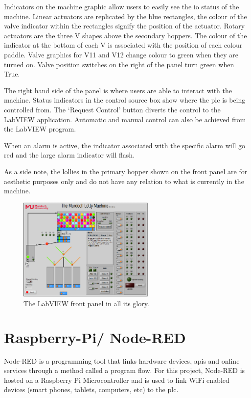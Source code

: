             Indicators on the machine graphic allow users to easily see the \acrshort{io} status of the machine. Linear actuators are replicated by the blue rectangles, the colour of the valve indicator within the rectangles signify the position of the actuator. 
            Rotary actuators are the three V shapes above the secondary hoppers. The colour of the indicator at the bottom of each V is associated with the position of each colour paddle.
            Valve graphics for V11 and V12 change colour to green when they are turned on. Valve position switches on the right of the panel turn green when True. 

            The right hand side of the panel is where users are able to interact with the machine. Status indicators in the control source box show where the \acrshort{plc} is being controlled from. The `Request Control' button diverts the control to the LabVIEW application. Automatic and manual control can also be achieved from the LabVIEW program. 

            When an alarm is active, the indicator associated with the specific alarm will go red and the large alarm indicator will flash. 

            As a side note, the lollies in the primary hopper shown on the front panel are for aesthetic purposes only and do not have any relation to what is currently in the machine. 

        \begin{figure}[H]
                \centering
                \includegraphics[width = 0.6\textwidth]{2_images/labViewFrontOverview}
                \caption{The LabVIEW front panel in all its glory.}
                \label{fig:abViewFrontOverview}
        \end{figure}               


\section{Raspberry-Pi/ Node-RED}
    Node-RED is a programming tool that links hardware devices, \acrshort{api}s and online services through a method called a program flow. For this project, Node-RED is hosted on a Raspberry Pi Microcontroller and is used to link WiFi enabled devices (smart phones, tablets, computers, etc) to the \acrshort{plc}.

